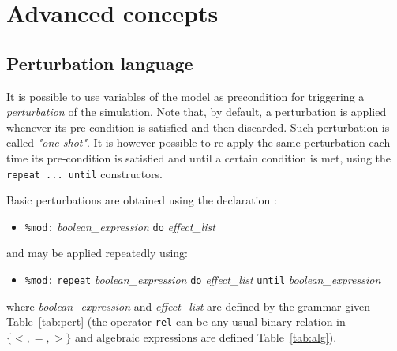 \documentclass[11pt]{book}
\def\ttt#1{\texttt{#1}}
\def\set#1{\{#1\}}
\def\ITE#1{\begin{itemize}#1\end{itemize}}
\begin{document}
\chapter{Advanced concepts}\label{chap:advanced}

\section{Perturbation language}\label{sec:mod}

It is possible to use variables of the model as precondition for triggering a \emph{perturbation} of the simulation. Note that, by default, a perturbation is applied whenever its pre-condition is satisfied and then discarded. Such perturbation is called \emph{"one shot"}. It is however possible to re-apply the same perturbation each time its pre-condition is satisfied and until a certain condition is met, using the \ttt{repeat ... until} constructors.

Basic perturbations are obtained using the declaration :
\ITE{
\item[] \ttt{\%mod:} \textit{boolean\_expression} \ttt{do} \textit{effect\_list} 
}
and may be applied repeatedly using:
\ITE{
\item[] \ttt{\%mod:} \ttt{repeat} \textit{boolean\_expression} \ttt{do} \textit{effect\_list} \ttt{until} \textit{boolean\_expression} 
}
where \textit{boolean\_expression} and \textit{effect\_list} are defined by the grammar given  Table~\ref{tab:pert} (the operator \ttt{rel} can be any usual binary relation in $\set{<,=,>}$ and algebraic expressions are defined Table~\ref{tab:alg}).
\end{document}
